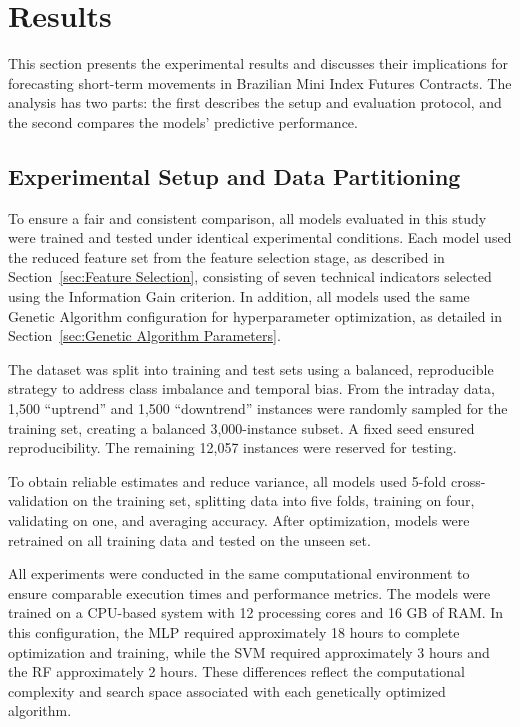 \documentclass[conference]{IEEEtran}
\begin{document}
\section{Results}
\label{sec:results}

This section presents the experimental results and discusses their implications for forecasting short-term movements in Brazilian Mini Index Futures Contracts. The analysis has two parts: the first describes the setup and evaluation protocol, and the second compares the models' predictive performance.

\subsection{Experimental Setup and Data Partitioning}

To ensure a fair and consistent comparison, all models evaluated in this study were trained and tested under identical experimental conditions. Each model used the reduced feature set from the feature selection stage, as described in Section~\ref{sec:Feature Selection}, consisting of seven technical indicators selected using the Information Gain criterion. In addition, all models used the same Genetic Algorithm configuration for hyperparameter optimization, as detailed in Section~\ref{sec:Genetic Algorithm Parameters}.

The dataset was split into training and test sets using a balanced, reproducible strategy to address class imbalance and temporal bias. From the intraday data, 1,500 ``uptrend'' and 1,500 ``downtrend'' instances were randomly sampled for the training set, creating a balanced 3,000-instance subset. A fixed seed ensured reproducibility. The remaining 12,057 instances were reserved for testing.

To obtain reliable estimates and reduce variance, all models used 5-fold cross-validation on the training set, splitting data into five folds, training on four, validating on one, and averaging accuracy. After optimization, models were retrained on all training data and tested on the unseen set.

All experiments were conducted in the same computational environment to ensure comparable execution times and performance metrics. The models were trained on a CPU-based system with 12 processing cores and 16 GB of RAM. In this configuration, the MLP required approximately 18 hours to complete optimization and training, while the SVM required approximately 3 hours and the RF approximately 2 hours. These differences reflect the computational complexity and search space associated with each genetically optimized algorithm.
\end{document}
